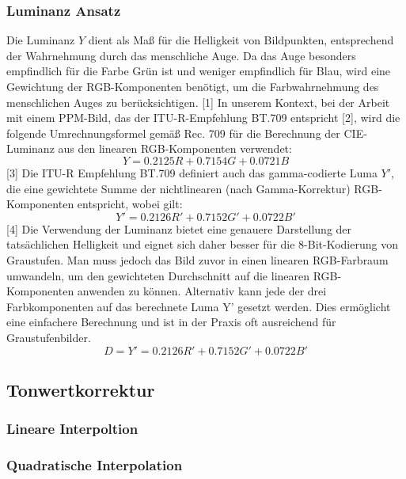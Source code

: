 \documentclass[course=erap]{aspdoc}
\begin{document}
\subsubsection{Luminanz Ansatz}
Die Luminanz $Y$ dient als Maß für die Helligkeit von Bildpunkten, entsprechend der Wahrnehmung durch das menschliche Auge. Da das Auge besonders empfindlich für die Farbe Grün ist und weniger empfindlich für Blau, wird eine Gewichtung der RGB-Komponenten benötigt, um die Farbwahrnehmung des menschlichen Auges zu berücksichtigen. [1]
In unserem Kontext, bei der Arbeit mit einem PPM-Bild, das der ITU-R-Empfehlung BT.709 entspricht [2], wird die folgende Umrechnungsformel gemäß Rec. 709 für die Berechnung der CIE-Luminanz aus den linearen RGB-Komponenten verwendet:
 \[Y = 0.2125R + 0.7154G + 0.0721B \] [3]
Die ITU-R Empfehlung BT.709 definiert auch das gamma-codierte Luma $Y'$, die eine gewichtete Summe der nichtlinearen (nach Gamma-Korrektur) RGB-Komponenten entspricht, wobei gilt:
 \[Y' = 0.2126R' + 0.7152G' + 0.0722B' \] [4]
Die Verwendung der Luminanz bietet eine genauere Darstellung der tatsächlichen Helligkeit und eignet sich daher besser für die 8-Bit-Kodierung von Graustufen. Man muss jedoch das Bild zuvor in einen linearen RGB-Farbraum umwandeln, um den gewichteten Durchschnitt auf die linearen RGB-Komponenten anwenden zu können.
Alternativ kann jede der drei Farbkomponenten auf das berechnete Luma Y' gesetzt werden. Dies ermöglicht eine einfachere Berechnung und ist in der Praxis oft ausreichend für Graustufenbilder.
 \[ D = Y' = 0.2126R' + 0.7152G' + 0.0722B' \]   



\subsection{Tonwertkorrektur}

\subsubsection{Lineare Interpoltion}

\subsubsection{Quadratische Interpolation}
\end{document}
